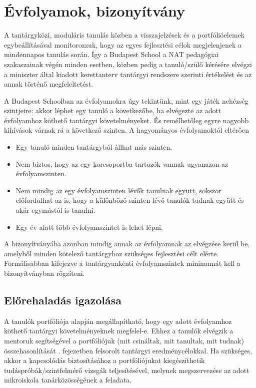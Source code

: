 \section{Évfolyamok, bizonyítvány}
\label{sec:evfolyamok}

A tantárgyközi, moduláris tanulás közben a visszajelzések és a portfólióelemek
egybeállításával monitorozzuk, hogy az egyes fejlesztési célok megjelenjenek a
mindennapos tanulás során. Így a Budapest School a NAT pedagógiai szakaszainak
végén minden esetben, közben pedig a tanuló/szülő kérésére elvégzi a miniszter
által kiadott kerettanterv tantárgyi rendszere szerinti értékelést és az annak
történő megfeleltetést.

A Budapest Schoolban az évfolyamokra úgy tekintünk, mint egy játék nehézség
szintjeire: akkor léphet egy tanuló a következőbe, ha elvégezte az adott
évfolyamhoz köthető tantárgyi követelményeket. És remélhetőleg egyre nagyobb
kihívások várnak rá a következő szinten. A hagyományos évfolyamoktól eltérően

\begin{itemize}
  \item Egy tanuló minden tantárgyból állhat más szinten.
  \item Nem biztos, hogy az egy korcsoportba tartozók vannak ugyanazon az
        évfolyamszinten.
  \item Nem mindig az egy évfolyamszinten lévők tanulnak együtt, sokszor
        előfordulhat az is, hogy a különböző szinten lévő tanulók tudnak együtt és akár
        egymástól is tanulni.
  \item Egy év alatt több évfolyamszintet is lehet lépni.
\end{itemize}

A bizonyítványába azonban mindig annak az évfolyamnak az elvégzése kerül be,
amelyből minden kötelező tantárgyhoz szükséges fejlesztési célt elérte.
Formálisabban kifejezve a tantárgyankénti évfolyamszintek minimumát kell a
bizonyítványban rögzíteni.

\subsection{Előrehaladás igazolása}
A tanulók portfóliója alapján megállapítható, hogy egy adott évfolyamhoz
köthető tantárgyi követelményeknek megfelel-e. Ehhez a tanulók elvégzik a
mentoruk segítségével a portfóliójuk (mit csináltak, mit tanultak, mit tudnak)
összehasonlítását  . fejezetben felsorolt tantárgyi
eredménycélokkal. Ha szükséges, akkor a kapcsolódás biztosításához a
portfóliójukat kiegészíthetik tudáspróbák/szintfelmérő vizsgák teljesítésével,
melynek megszervezése az adott mikroiskola tanárközösségének a feladata.

